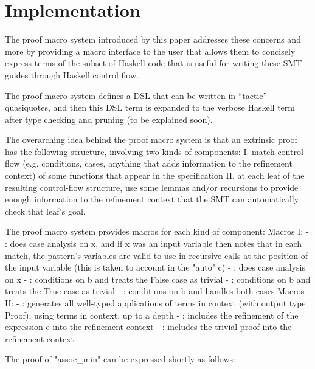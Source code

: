 \section{Implementation}

The proof macro system introduced by this paper addresses these concerns and more by providing a macro interface to the user that allows them to concisely express terms of the subset of Haskell code that is useful for writing these SMT guides through Haskell control flow.

The proof macro system defines a DSL that can be written in ``tactic'' quasiquotes, and then this DSL term is expanded to the verbose Haskell term after type checking and pruning (to be explained soon).

The overarching idea behind the proof macro system is that an extrinsic proof has the following structure, involving two kinds of components:
I. match control flow (e.g. conditions, cases, anything that adds information to the refinement context) of some functions that appear in the specification
II. at each leaf of the resulting control-flow structure, use some lemmas and/or recursions to provide enough information to the refinement context that the SMT can automatically check that leaf's goal.


The proof macro system provides macros for each kind of component:
Macros I:
- : does case analysis on x, and if x was an input variable then notes that in each match, the pattern's variables are valid to use in recursive calls at the position of the input variable (this is taken to account in the "auto" c)
- : does case analysis on x
- : conditions on b and treats the False case as trivial 
- : conditions on b and treats the True case as trivial
- : conditions on b and handles both cases
Macros II:
- : generates all well-typed applications of terms in context (with output type Proof), using terms in context, up to a depth
- : includes the refinement of the expression e into the refinement context
- : includes the trivial proof into the refinement context

The proof of "assoc\_min" can be expressed shortly as follows:

